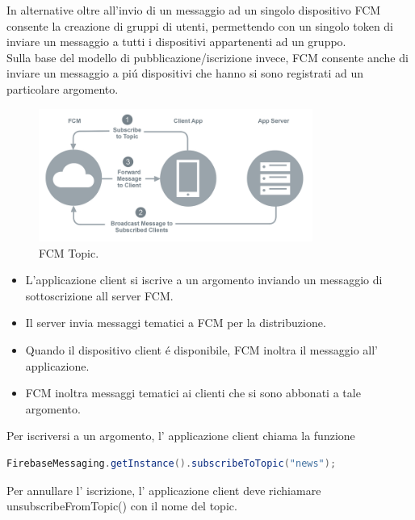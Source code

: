 In alternative oltre all'invio di un messaggio ad un singolo dispositivo FCM consente la creazione di gruppi di utenti, permettendo con un singolo token di inviare un messaggio a tutti i dispositivi appartenenti ad un gruppo.\\

Sulla base del modello di pubblicazione/iscrizione invece, FCM consente anche di inviare un messaggio a pi\'u dispositivi che hanno si sono registrati ad un particolare argomento.

\begin{figure}[!hb]
  \centering
  \includegraphics[width=0.8\textwidth]{immagini/fcm_topic.png}
  \caption{FCM Topic.}\label{fig:FCM Topic}
\end{figure}


    \begin{itemize}
        \item L'applicazione client si iscrive a un argomento inviando un messaggio di sottoscrizione all server FCM.
        \item Il server invia messaggi tematici a FCM per la distribuzione.
        \item Quando il dispositivo client \'e disponibile, FCM inoltra il messaggio all' applicazione.
        \item  FCM inoltra messaggi tematici ai clienti che si sono abbonati a tale argomento.

    \end{itemize}




Per iscriversi a un argomento, l' applicazione client chiama la funzione

\begin{lstlisting}[language=java,caption={FCM topic}]
 FirebaseMessaging.getInstance().subscribeToTopic("news");
\end{lstlisting}

Per annullare l' iscrizione, l' applicazione client deve richiamare unsubscribeFromTopic() con il nome del topic.





